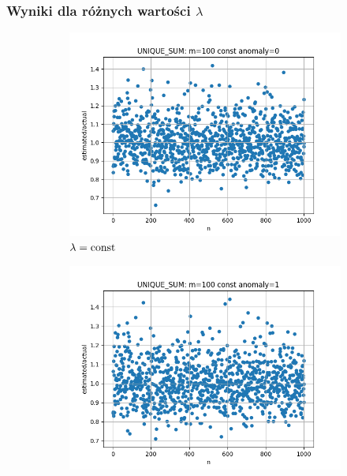 \documentclass{article}
\begin{document}
    \subsubsection{Wyniki dla różnych wartości $\lambda$}

    \begin{figure}[H]
        \begin{subfigure}{0.6\textwidth}
            \centering
            \includegraphics[width=\linewidth]{sum/zad1_const_0.png}
            \caption{$\lambda = \textnormal{const}$}
        \end{subfigure}
        \begin{subfigure}{0.6\textwidth}
            \centering
            \includegraphics[width=\linewidth]{sum/zad1_const_1.png}

\end{subfigure}
\end{figure}
\end{document}
